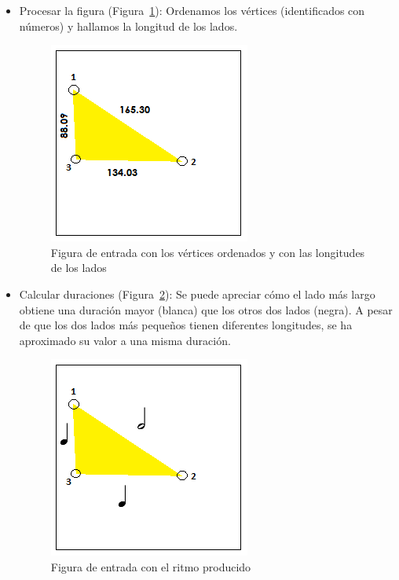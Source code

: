 \begin{itemize}

	\item Procesar la figura (Figura~\ref{fig:Figura1Voz1}): Ordenamos los vértices (identificados con números) y hallamos la longitud de los lados. \\

		\begin{figure}[!htbp]
		\centering
		\hspace*{0.0in}
		\includegraphics[scale=1.0]{graphics/simpletest1-F1.png}
		\caption{Figura de entrada con los vértices ordenados y con las longitudes de los lados}
		\label{fig:Figura1Voz1}
		\end{figure}

	\item Calcular duraciones (Figura~\ref{fig:Figura2Voz1}): Se puede apreciar cómo el lado más largo obtiene una duración mayor (blanca) que los otros dos lados (negra). A pesar de que los dos lados más pequeños tienen diferentes longitudes, se ha aproximado su valor a una misma duración.\\
		
		\begin{figure}[!htbp]
		\centering
		\hspace*{0.0in}
		\includegraphics[scale=1.0]{graphics/simpletest1-F2.png}
		\caption{Figura de entrada con el ritmo producido}
		\label{fig:Figura2Voz1}
		\end{figure}


\end{itemize}
